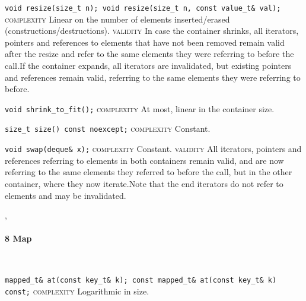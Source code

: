 \noindent{}\hspace*{0.25em}\lstinline[basicstyle=\ttfamily\color{corange}]{void resize(size_t n); void resize(size_t n, const value_t& val);} \textsc{complexity} Linear on the number of elements inserted/erased (constructions/destructions). \textsc{validity} In case the container shrinks, all iterators, pointers and references to elements that have not been removed remain valid after the resize and refer to the same elements they were referring to before the call.If the container expands, all iterators are invalidated, but existing pointers and references remain valid, referring to the same elements they were referring to before.\\\vspace{-0.6em}

\noindent{}\hspace*{0.25em}\lstinline[basicstyle=\ttfamily\color{corange}]{void shrink_to_fit();} \textsc{complexity} At most, linear in the container size.\\\vspace{-0.6em}

\noindent{}\hspace*{0.25em}\lstinline[basicstyle=\ttfamily\color{cgreen}]{size_t size() const noexcept;} \textsc{complexity} Constant.\\\vspace{-0.6em}

\noindent{}\hspace*{0.25em}\lstinline[basicstyle=\ttfamily\color{cgreen}]{void swap(deque& x);} \textsc{complexity} Constant. \textsc{validity} All iterators, pointers and references referring to elements in both containers remain valid, and are now referring to the same elements they referred to before the call, but in the other container, where they now iterate.Note that the end iterators do not refer to elements and may be invalidated.\\\vspace{-0.6em}


\sep
{}
\paragraph{8 Map}\mbox{}\vspace{0.5em}\\
\noindent{}\hspace*{0.25em}\lstinline[basicstyle=\ttfamily\color{clime}]{mapped_t& at(const key_t& k); const mapped_t& at(const key_t& k) const;} \textsc{complexity} Logarithmic in size.\\\vspace{-0.6em}

